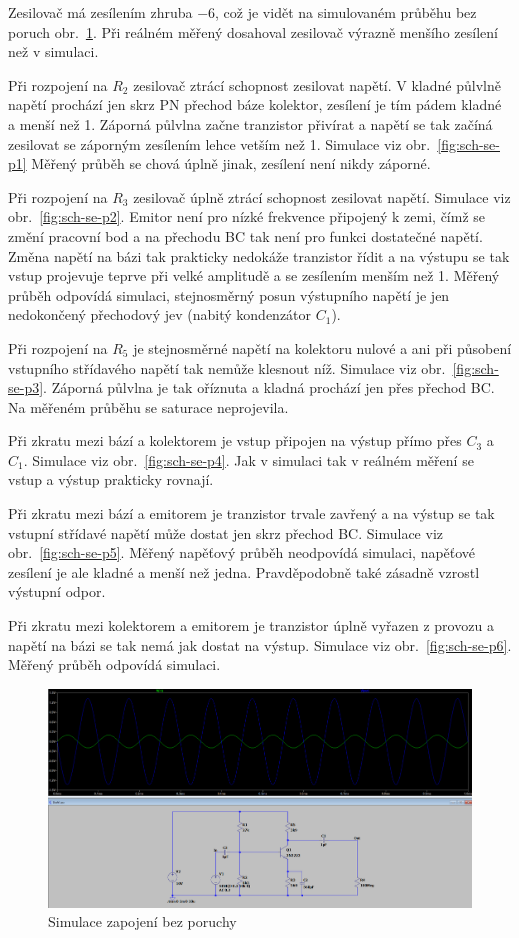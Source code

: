 \documentclass{article}
\newcommand \obr[1]
{ obr.~\ref{#1}}
\begin{document}
Zesilovač má zesílením zhruba \(-6\), což je vidět na simulovaném průběhu bez poruch \obr{fig:sch-se-bezPoruch}.
Při reálném měřený dosahoval zesilovač výrazně menšího zesílení než v simulaci.


Při rozpojení na \(R_2\) zesilovač ztrácí schopnost zesilovat napětí.
V kladné půlvlně napětí prochází jen skrz PN přechod báze kolektor, zesílení je tím pádem kladné a menší než 1.
Záporná půlvlna začne tranzistor přivírat a napětí se tak začíná zesilovat se záporným zesílením lehce vetším než 1.
Simulace viz \obr{fig:sch-se-p1}
Měřený průběh se chová úplně jinak, zesílení není nikdy záporné.


Při rozpojení na \(R_3\) zesilovač úplně ztrácí schopnost zesilovat napětí.
Simulace viz \obr{fig:sch-se-p2}.
Emitor není pro nízké frekvence připojený k zemi, čímž se změní pracovní bod a na přechodu BC tak není pro funkci dostatečné napětí.
Změna napětí na bázi tak prakticky nedokáže tranzistor řídit a na výstupu se tak vstup projevuje teprve při velké amplitudě a se zesílením menším než 1.
Měřený průběh odpovídá simulaci, stejnosměrný posun výstupního napětí je jen nedokončený přechodový jev (nabitý kondenzátor \(C_1\)).


Při rozpojení na \(R_5\) je stejnosměrné napětí na kolektoru nulové a ani při působení vstupního střídavého napětí tak nemůže klesnout níž.
Simulace viz \obr{fig:sch-se-p3}.
Záporná půlvlna je tak oříznuta a kladná prochází jen přes přechod BC.
Na měřeném průběhu se saturace neprojevila.


Při zkratu mezi bází a kolektorem je vstup připojen na výstup přímo přes \(C_3\) a \(C_1\).
Simulace viz \obr{fig:sch-se-p4}.
Jak v simulaci tak v reálném měření se vstup a výstup prakticky rovnají.


Při zkratu mezi bází a emitorem je tranzistor trvale zavřený a na výstup se tak vstupní střídavé napětí může dostat jen skrz přechod BC.
Simulace viz \obr{fig:sch-se-p5}.
Měřený napěťový průběh neodpovídá simulaci, napěťové zesílení je ale kladné a menší než jedna.
Pravděpodobně také zásadně vzrostl výstupní odpor.

Při zkratu mezi kolektorem a emitorem je tranzistor úplně vyřazen z provozu a napětí na bázi se tak nemá jak dostat na výstup.
Simulace viz \obr{fig:sch-se-p6}.
Měřený průběh odpovídá simulaci.

\begin{figure}[H]
  \centering
  \includegraphics[width=\textwidth]{sim/ukol1/bezPoruch.png}
  \caption{Simulace zapojení bez poruchy}
  \label{fig:sch-se-bezPoruch}
\end{figure}
\end{document}
